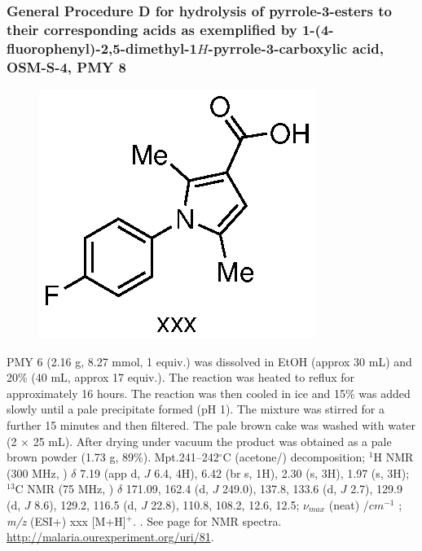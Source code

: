 \documentclass[12pt, a4paper,titlepage]{article}
\begin{document}
\subsubsection*{ General Procedure D for hydrolysis of pyrrole-3-esters to their corresponding acids as exemplified by 1-(4-fluorophenyl)-2,5-dimethyl-1$H$-pyrrole-3-carboxylic acid, OSM-S-4, PMY 8}
\label{exp:PMY8}
	\begin{figure}[H]
	\begin{center}
	\includegraphics{exp/PMY8.eps}
	\end{center}
	\vspace{-25pt}	
	\end{figure}	

PMY 6 (2.16 g, 8.27 mmol, 1 equiv.) was dissolved in EtOH (approx 30 mL) and 20\%  (40 mL, approx 17 equiv.). The reaction was heated to reflux for approximately 16 hours. The reaction was then cooled in ice and  15\%  was added slowly until a pale precipitate formed (pH 1). The mixture was stirred for a further 15 minutes and then filtered. The pale brown cake was washed with water (2 $\times$ 25 mL). After drying under vacuum the product was obtained as a pale brown powder (1.73 g, 89\%).
Mpt.241--242$^\circ$C (acetone/) decomposition; 
$^1$H NMR (300 MHz, ) $\delta$ 7.19 (app d, $J$ 6.4, 4H), 6.42 (br s, 1H), 2.30 (s, 3H), 1.97 (s, 3H); 
  $^{13}$C NMR (75 MHz, ) $\delta$ 171.09, 162.4 (d, $J$ 249.0), 137.8, 133.6 (d, $J$ 2.7), 129.9 (d, $J$ 8.6), 129.2, 116.5 (d, $J$ 22.8), 110.8, 108.2, 12.6, 12.5; 
 $\nu_{max}$ (neat) /$cm^{-1}$ ; 
\emph{m/z} (ESI+) xxx [M+H]$^+$.
. 
 See page \pageref{spec:PMY8} for NMR spectra. \url{http://malaria.ourexperiment.org/uri/81}. 
\end{document}
